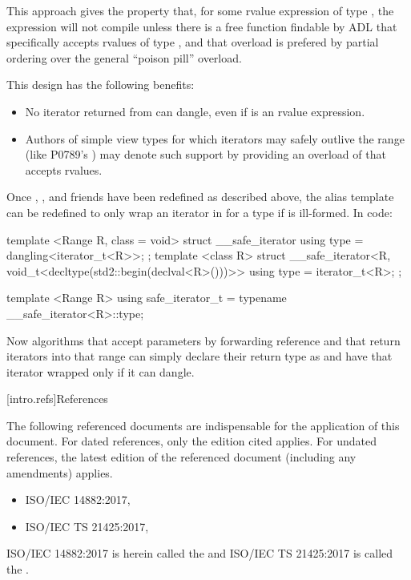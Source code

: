 This approach gives  the property that, for some rvalue
expression  of type , the expression 
will not compile unless there is a free function  findable by
ADL that specifically accepts rvalues of type , and that overload is
prefered by partial ordering over the general  ``poison
pill'' overload.

\pnum
This design has the following benefits:

\begin{itemize}
\item No iterator returned from  can dangle, even if
 is an rvalue expression.
\item Authors of simple view types for which iterators may safely outlive the
range (like P0789's ) may denote such support by providing an
overload of  that accepts rvalues.
\end{itemize}

\pnum
Once , , and friends have been redefined as
described above, the  alias template can be redefined to
only wrap an iterator in  for a  type 
if  is ill-formed. In code:

\begin{codeblock}
template <Range R, class = void>
struct __safe_iterator {
  using type = dangling<iterator_t<R>>;
};
template <class R>
struct __safe_iterator<R, void_t<decltype(std2::begin(declval<R>()))>> {
  using type = iterator_t<R>;
};

template <Range R>
using safe_iterator_t = typename __safe_iterator<R>::type;
\end{codeblock}

Now algorithms that accept  parameters by forwarding reference and
that return iterators into that range can simply declare their return type as
 and have that iterator wrapped only if it can dangle.

[intro.refs]{References}

\pnum
The following referenced documents are indispensable for the
application of this document. For dated references, only the
edition cited applies. For undated references, the latest edition
of the referenced document (including any amendments) applies.

\begin{itemize}
\item ISO/IEC 14882:2017, 
\item ISO/IEC TS 21425:2017, 
\end{itemize}

ISO/IEC 14882:2017 is herein called the \defn{C\Rplus\Rplus\xspace Standard} and
ISO/IEC TS 21425:2017 is called the .
